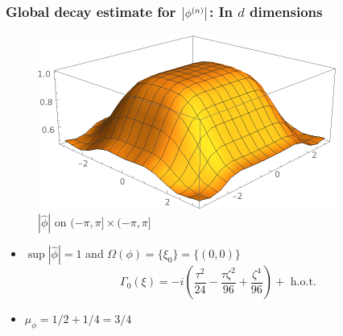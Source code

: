 \documentclass{beamer}
\theoremstyle{definition}
\begin{document}
\begin{frame}
\frametitle{Global decay estimate for $\abs{\phi^{(n)}}$: In $d$ dimensions}

\begin{figure}
	\vspace{-10pt}
	\centering
	\includegraphics[scale=0.4]{d_dim_ex_1}
	\caption{$|\widehat{\phi}|$ on $(-\pi, \pi] \times (-\pi, \pi]$}
\end{figure}

\begin{itemize}
	\item $\sup|\widehat{\phi}| = 1$ and $\Omega(\phi)= \{\xi_0 \}  = \{ (0,0) \} $
	\begin{equation*}
	\Gamma_{0}(\xi)=-i\left(\frac{\tau^2}{24}-\frac{\tau\zeta^2}{96} +\frac{ \zeta^4}{96}\right) + \text{ h.o.t.}
	\end{equation*}
	
	\item $\mu_\phi = 1/2 + 1/4 = 3/4$
\end{itemize}
\end{frame}
\end{document}
